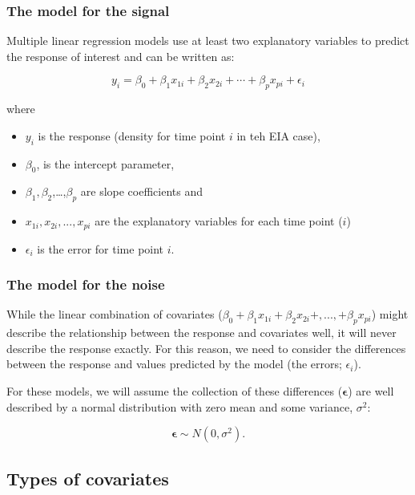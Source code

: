 \documentclass[
  oneside]{krantz}
\providecommand{\tightlist}{%
  \setlength{\itemsep}{0pt}\setlength{\parskip}{0pt}}
\begin{document}
\hypertarget{the-model-for-the-signal}{%
\subsubsection{The model for the signal}\label{the-model-for-the-signal}}

Multiple linear regression models use at least two explanatory variables to predict the response of interest and can be written as:

\[
y_{i} =  \beta_0 +
\beta_1x_{1i} + \beta_2x_{2i} + \cdots +\beta_px_{pi} +\epsilon_{i}
\label{eq:lreg}
\]

where

\begin{itemize}
\tightlist
\item
  \(y_{i}\) is the response (density for time point \(i\) in teh EIA case),
\item
  \(\beta_0\), is the intercept parameter,
\item
  \(\beta_1,\beta_2\),\ldots,\(\beta_p\) are slope coefficients and
\item
  \(x_{1i}, x_{2i},...,x_{pi}\) are the explanatory variables for each time point (\(i\))
\item
  \(\epsilon_i\) is the error for time point \(i\).
\end{itemize}

\hypertarget{the-model-for-the-noise}{%
\subsubsection{The model for the noise}\label{the-model-for-the-noise}}

While the linear combination of covariates (\(\beta_0 + \beta_1x_{1i} + \beta_2x_{2i} +,...,+\beta_px_{pi}\)) might describe the relationship between the response and covariates well, it will never describe the response exactly. For this reason, we need to consider the differences between the response and values predicted by the model (the errors; \(\epsilon_{i}\)).

For these models, we will assume the collection of these differences (\(\boldsymbol{\epsilon}\)) are well described by a normal distribution with zero mean and some variance, \(\sigma^2\):

\begin{equation}
\boldsymbol{\epsilon} \sim N(0,\sigma^2).
\end{equation}

\hypertarget{types-of-covariates}{%
\subsection{Types of covariates}\label{types-of-covariates}}
\end{document}
